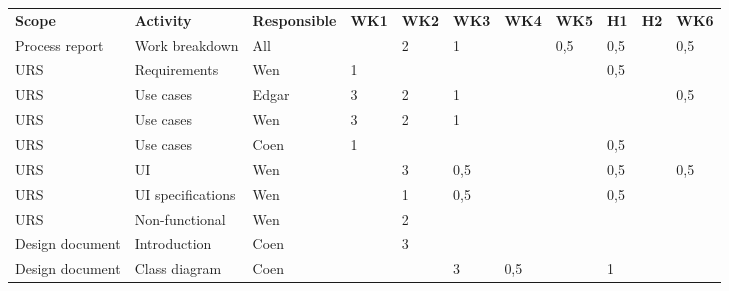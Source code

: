  

\begin{table}
	\centering
	\begin{tabular}{lllllllllll}
		\textbf{Scope}  & \textbf{Activity}  & \textbf{Responsible} & \textbf{WK1} & \textbf{WK2} & \textbf{WK3} & \textbf{WK4} & \textbf{WK5} & \textbf{H1} & \textbf{H2} & \textbf{WK6} \\
		Process report  & Work breakdown     & All                  &              & 2            & 1            &              & 0,5          & 0,5         &             & 0,5          \\
		URS             & Requirements       & Wen                  & 1            &              &              &              &              & 0,5         &             &              \\
		URS             & Use cases          & Edgar                & 3            & 2            & 1            &              &              &             &             & 0,5          \\
		URS             & Use cases          & Wen                  & 3            & 2            & 1            &              &              &             &             &              \\
		URS             & Use cases          & Coen                 & 1            &              &              &              &              & 0,5         &             &              \\
		URS             & UI                 & Wen                  &              & 3            & 0,5          &              &              & 0,5         &             & 0,5          \\
		URS             & UI specifications  & Wen                  &              & 1            & 0,5          &              &              & 0,5         &             &              \\
		URS             & Non-functional     & Wen                  &              & 2            &              &              &              &             &             &              \\
		Design document & Introduction       & Coen                 &              & 3            &              &              &              &             &             &              \\
		Design document & Class diagram      & Coen                 &              &              & 3            & 0,5          &              & 1           &             &              \\

\end{tabular}
\end{table}
